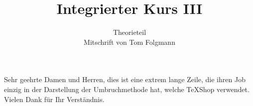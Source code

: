 \documentclass[11pt]{report}
\title{Integrierter Kurs III}
\author{Theorieteil\\Mitschrift von Tom Folgmann}
\begin{document}
	\maketitle
	
	
		Sehr geehrte Damen und Herren, dies ist eine extrem lange Zeile, die ihren Job einzig in der Darstellung der Umbruchmethode hat, welche TeXShop verwendet. Vielen Dank f\"ur Ihr Verst\"andnis.
	
	
	
	
	
	
	
	
	
	
	
	
	
	
	
	
	
	
	
	
	
	
	
\end{document}
